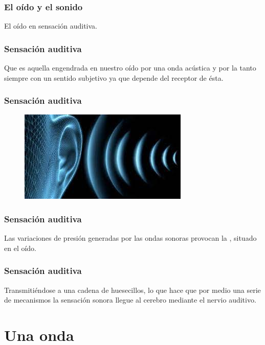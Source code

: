 \documentclass[14pt]{beamer}
\begin{document}
\begin{frame}
\frametitle{El oído y el sonido}
El oído  en sensación auditiva.
\end{frame}
\begin{frame}
\frametitle{Sensación auditiva}
Que es aquella engendrada en nuestro oído por una onda acústica y por la tanto siempre con un sentido subjetivo ya que depende del receptor de ésta.
\end{frame}
\begin{frame}
\frametitle{Sensación auditiva}
\begin{figure}
\centering
\includegraphics[scale=0.7]{Imagenes/Ondas_05.jpg}
\end{figure}
\end{frame}
\begin{frame}
\frametitle{Sensación auditiva}
Las variaciones de presión generadas por las ondas sonoras provocan la , situado en el oído.
\end{frame}
\begin{frame}
\frametitle{Sensación auditiva}
Transmitiéndose a una cadena de huesecillos, \pause lo que hace que por medio una serie de mecanismos la sensación sonora llegue al cerebro mediante el nervio auditivo.
\end{frame}
\section{Una onda}
\end{document}

